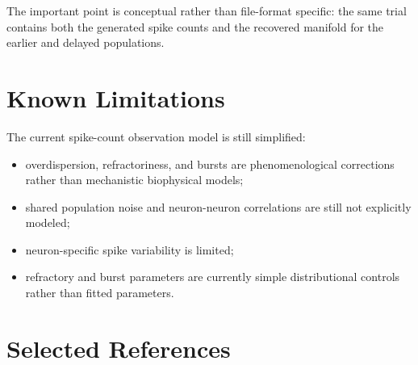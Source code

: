 \documentclass[11pt]{article}
\begin{document}
The important point is conceptual rather than file-format specific: the same
trial contains both the generated spike counts and the recovered manifold for
the earlier and delayed populations.

\section{Known Limitations}

The current spike-count observation model is still simplified:

\begin{itemize}
    \item overdispersion, refractoriness, and bursts are phenomenological
    corrections rather than mechanistic biophysical models;
    \item shared population noise and neuron-neuron correlations are still not
    explicitly modeled;
    \item neuron-specific spike variability is limited;
    \item refractory and burst parameters are currently simple distributional
    controls rather than fitted parameters.
\end{itemize}

\section{Selected References}
\end{document}
